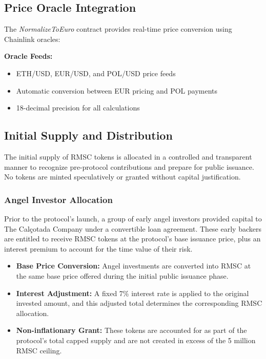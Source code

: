 \documentclass[conference]{IEEEtran}
\begin{document}
\subsection{Price Oracle Integration}

The \textit{NormalizeToEuro} contract provides real-time price conversion using Chainlink oracles:

\textbf{Oracle Feeds:}
\begin{itemize}
    \item ETH/USD, EUR/USD, and POL/USD price feeds
    \item Automatic conversion between EUR pricing and POL payments
    \item 18-decimal precision for all calculations
\end{itemize}

\subsection{Initial Supply and Distribution}

The initial supply of RMSC tokens is allocated in a controlled and transparent manner to recognize pre-protocol contributions and prepare for public issuance. No tokens are minted speculatively or granted without capital justification.

\subsubsection{Angel Investor Allocation}

Prior to the protocol's launch, a group of early angel investors provided capital to The Calçotada Company under a convertible loan agreement. These early backers are entitled to receive RMSC tokens at the protocol’s base issuance price, plus an interest premium to account for the time value of their risk.

\begin{itemize}
    \item \textbf{Base Price Conversion:} Angel investments are converted into RMSC at the same base price offered during the initial public issuance phase.
    \item \textbf{Interest Adjustment:} A fixed 7\% interest rate is applied to the original invested amount, and this adjusted total determines the corresponding RMSC allocation.
    \item \textbf{Non-inflationary Grant:} These tokens are accounted for as part of the protocol's total capped supply and are not created in excess of the 5 million RMSC ceiling.
\end{itemize}
\end{document}
